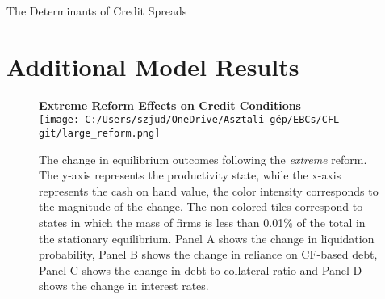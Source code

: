\documentclass[12pt]{article}
\begin{document}
\begin{table}[H]
    \centering
    \caption{The Determinants of Credit Spreads}
    \label{tab:spread_table_new}
    \caption{\small The main determinants of credit spreads of new issuances, considering the number of secured debt contracts. Robust standard errors are reported in parentheses, *** p$<$0.01, ** p$<$0.05, * p$<$0.1.}
\end{table}

\section{Additional Model Results \label{sec:appmodelresults}}


\begin{figure}[H]  %
    \centering  
    \textbf{\large Extreme Reform Effects on Credit Conditions \vspace{3mm} \\}   %
    \texttt{[image: C:/Users/szjud/OneDrive/Asztali gép/EBCs/CFL-git/large\_reform.png]}
    \caption{\small The change in equilibrium outcomes following the \textit{extreme} reform. The y-axis represents the productivity state, while the x-axis represents the cash on hand value, the color intensity corresponds to the magnitude of the change. The non-colored tiles correspond to states in which the mass of firms is less than 0.01\% of the total in the stationary equilibrium. Panel A shows the change in liquidation probability, Panel B shows the change in reliance on CF-based debt, Panel C shows the change in debt-to-collateral ratio and Panel D shows the change in interest rates. }
    \label{chart:extpoleffects}
\end{figure}
\end{document}
